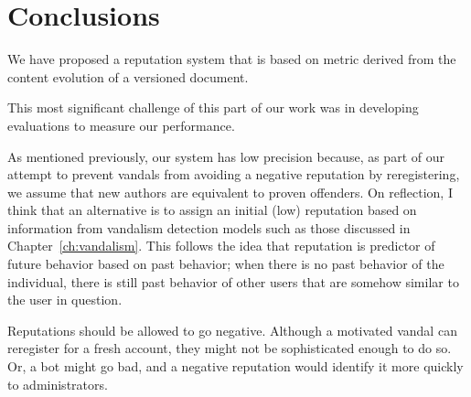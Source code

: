 \section{Conclusions}

We have proposed a reputation system that is
based on metric derived from the content evolution
of a versioned document.

This most significant challenge of this part of our work
was in developing evaluations to measure our performance.

As mentioned previously, our system has low precision because,
as part of our attempt to prevent vandals from avoiding a
negative reputation by reregistering,
we assume that new authors are equivalent to proven offenders.
On reflection, I think that an alternative is to assign an
initial (low) reputation based on information from vandalism
detection models such as those discussed in Chapter~\ref{ch:vandalism}.
This follows the idea that reputation is predictor of future
behavior based on past behavior; when there is no past behavior
of the individual, there is still past behavior of other users
that are somehow similar to the user in question.

Reputations should be allowed to go negative.
Although a motivated vandal can reregister for a fresh account,
they might not be sophisticated enough to do so.
Or, a bot might go bad, and a negative reputation
would identify it more quickly to administrators.

